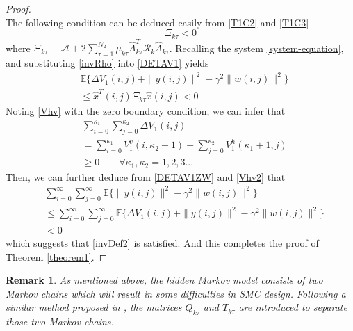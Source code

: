 \documentclass[conference]{IEEEtran}
\newtheorem{remark}{Remark}
\begin{document}
\begin{proof}
\begin{equation}
	\end{equation} 
	The following condition can be deduced easily from \eqref{T1C2} and \eqref{T1C3}
	\begin{equation}\label{T1P4}
	\mathcal{\varXi}_{k\tau }<0
	\end{equation}	
	where $\mathcal{\varXi}_{k\tau } \equiv \mathcal{A} +2\sum_{\tau =1}^{N_{2}}\mu_{k\tau }\hat{A}^{T}_{k\tau }\mathcal{R}_{k}\hat{A}_{k\tau }$. 
	Recalling the system \eqref{system-equation}, and substituting \eqref{invRho} into \eqref{DETAV1} yields
	\begin{equation}\label{DETAV1ZW}
		\begin{split}
			&\mathbb{E}\{\varDelta V_{1}(i,j)+\|y(i,j)\|^{2}-\gamma^{2}\|w(i,j)\|^{2}  \}\\
			&\leq \hat{x}^{T}(i,j)\mathcal{\varXi}_{k\tau } \hat{x}(i,j)<0
		\end{split}
	\end{equation}
	Noting \eqref{Vhv} with the zero boundary condition, we can infer that
	\begin{equation} \label{Vhv2}
	\begin{split}
	&\sum_{i=0}^{\kappa_{1}}\sum_{j=0}^{\kappa_{2}}  \varDelta V_{1}(i,j)\\
	&=\sum_{i=0}^{\kappa_{1}}V^{v}_{1}(i,\kappa_{2}+1) + \sum_{j=0}^{\kappa_{2}}V^{h}_{1}(\kappa_{1}+1,j) \\
	&\geq 0 \qquad \forall \kappa_{1},\kappa_{2} = 1,2,3...
	\end{split}
	\end{equation}
	Then, we can further deduce from \eqref{DETAV1ZW} and \eqref{Vhv2} that 
	\begin{equation}\label{DETAV1ZW2}
	\begin{split}
	&\sum_{i=0}^{\infty}\sum_{j=0}^{\infty}  \mathbb{E}\{\|y(i,j)\|^{2}-\gamma^{2}\|w(i,j)\|^{2}  \}\\
	&\leq \sum_{i=0}^{\infty}\sum_{j=0}^{\infty}  \mathbb{E}\{\varDelta V_{1}(i,j)+\|y(i,j)\|^{2}-\gamma^{2}\|w(i,j)\|^{2}  \}  \\
	&< 0
	\end{split}
	\end{equation}
	which suggests that \eqref{invDef2} is satisfied. And this completes the proof of Theorem \ref{theorem1}.
	
	
\end{proof}


\begin{remark}
	As mentioned above, the hidden Markov model consists of two Markov chains which will result in some difficulties in SMC design. Following a similar method proposed in \cite{passive_wu}, the matrices $Q_{k\tau }$ and $T_{k\tau}$ are introduced to separate those two Markov chains.
\end{remark}
\end{document}
